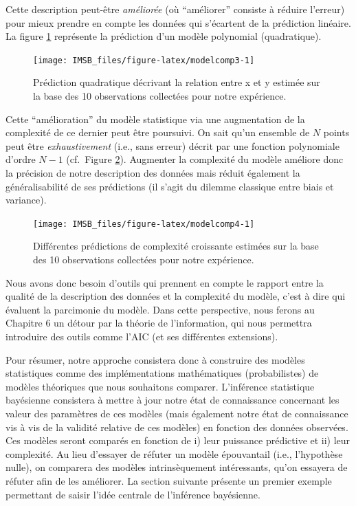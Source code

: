 \documentclass[
  a4paper,11pt,twoside,onecolumn,openright,final,oldfontcommands]{memoir}
\theoremstyle{definition}
\theoremstyle{definition}
\theoremstyle{definition}
\theoremstyle{definition}
\theoremstyle{remark}
\begin{document}
Cette description peut-être \emph{améliorée} (où ``améliorer'' consiste à réduire l'erreur) pour mieux prendre en compte les données qui s'écartent de la prédiction linéaire. La figure \ref{fig:modelcomp3} représente la prédiction d'un modèle polynomial (quadratique).

\begin{figure}[!htb]

{\centering \texttt{[image: IMSB\_files/figure-latex/modelcomp3-1]} 

}

\caption{Prédiction quadratique décrivant la relation entre x et y estimée sur la base des 10 observations collectées pour notre expérience.}\label{fig:modelcomp3}
\end{figure}

Cette ``amélioration'' du modèle statistique via une augmentation de la complexité de ce dernier peut être poursuivi. On sait qu'un ensemble de \(N\) points peut être \emph{exhaustivement} (i.e., sans erreur) décrit par une fonction polynomiale d'ordre \(N - 1\) (cf.~Figure \ref{fig:modelcomp4}). Augmenter la complexité du modèle améliore donc la précision de notre description des données mais réduit également la généralisabilité de ses prédictions (il s'agit du dilemme classique entre biais et variance).

\begin{figure}[!htb]

{\centering \texttt{[image: IMSB\_files/figure-latex/modelcomp4-1]} 

}

\caption{Différentes prédictions de complexité croissante estimées sur la base des 10 observations collectées pour notre expérience.}\label{fig:modelcomp4}
\end{figure}

Nous avons donc besoin d'outils qui prennent en compte le rapport entre la qualité de la description des données et la complexité du modèle, c'est à dire qui évaluent la parcimonie du modèle. Dans cette perspective, nous ferons au Chapitre 6 un détour par la théorie de l'information, qui nous permettra introduire des outils comme l'AIC (et ses différentes extensions).

Pour résumer, notre approche consistera donc à construire des modèles statistiques comme des implémentations mathématiques (probabilistes) de modèles théoriques que nous souhaitons comparer. L'inférence statistique bayésienne consistera à mettre à jour notre état de connaissance concernant les valeur des paramètres de ces modèles (mais également notre état de connaissance vis à vis de la validité relative de ces modèles) en fonction des données observées. Ces modèles seront comparés en fonction de i) leur puissance prédictive et ii) leur complexité. Au lieu d'essayer de réfuter un modèle épouvantail (i.e., l'hypothèse nulle), on comparera des modèles intrinsèquement intéressants, qu'on essayera de réfuter afin de les améliorer. La section suivante présente un premier exemple permettant de saisir l'idée centrale de l'inférence bayésienne.
\end{document}
